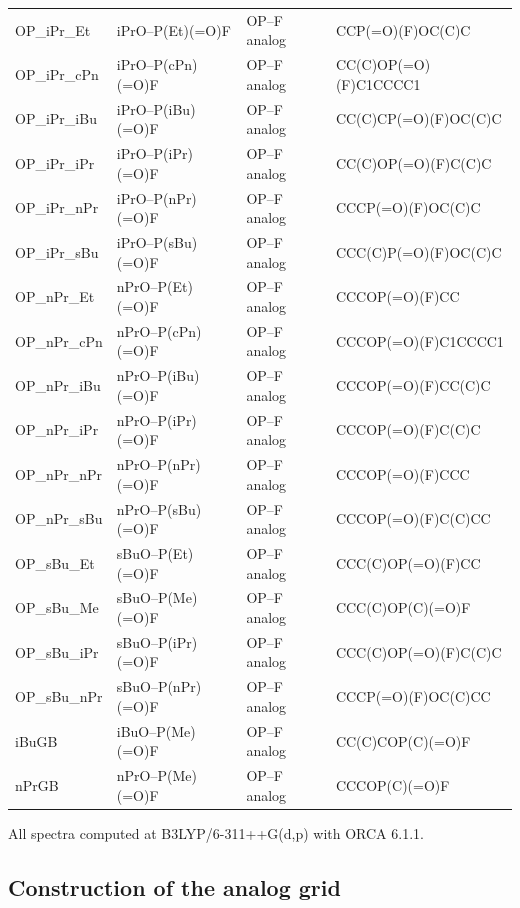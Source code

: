 \documentclass[11pt]{article}
\begin{document}
{\begin{longtable}{p{2.9cm} >{\raggedright\arraybackslash}p{2.8cm} >{\raggedright\arraybackslash}p{3.7cm} >{\ttfamily\raggedright\arraybackslash}p{4.4cm}}
OP\_iPr\_Et & iPrO--P(Et)(=O)F & OP--F analog & {CCP(=O)(F)OC(C)C} \\
OP\_iPr\_cPn & iPrO--P(cPn)(=O)F & OP--F analog & {CC(C)OP(=O)(F)C1CCCC1} \\
OP\_iPr\_iBu & iPrO--P(iBu)(=O)F & OP--F analog & {CC(C)CP(=O)(F)OC(C)C} \\
OP\_iPr\_iPr & iPrO--P(iPr)(=O)F & OP--F analog & {CC(C)OP(=O)(F)C(C)C} \\
OP\_iPr\_nPr & iPrO--P(nPr)(=O)F & OP--F analog & {CCCP(=O)(F)OC(C)C} \\
OP\_iPr\_sBu & iPrO--P(sBu)(=O)F & OP--F analog & {CCC(C)P(=O)(F)OC(C)C} \\
OP\_nPr\_Et & nPrO--P(Et)(=O)F & OP--F analog & {CCCOP(=O)(F)CC} \\
OP\_nPr\_cPn & nPrO--P(cPn)(=O)F & OP--F analog & {CCCOP(=O)(F)C1CCCC1} \\
OP\_nPr\_iBu & nPrO--P(iBu)(=O)F & OP--F analog & {CCCOP(=O)(F)CC(C)C} \\
OP\_nPr\_iPr & nPrO--P(iPr)(=O)F & OP--F analog & {CCCOP(=O)(F)C(C)C} \\
OP\_nPr\_nPr & nPrO--P(nPr)(=O)F & OP--F analog & {CCCOP(=O)(F)CCC} \\
OP\_nPr\_sBu & nPrO--P(sBu)(=O)F & OP--F analog & {CCCOP(=O)(F)C(C)CC} \\
OP\_sBu\_Et & sBuO--P(Et)(=O)F & OP--F analog & {CCC(C)OP(=O)(F)CC} \\
OP\_sBu\_Me & sBuO--P(Me)(=O)F & OP--F analog & {CCC(C)OP(C)(=O)F} \\
OP\_sBu\_iPr & sBuO--P(iPr)(=O)F & OP--F analog & {CCC(C)OP(=O)(F)C(C)C} \\
OP\_sBu\_nPr & sBuO--P(nPr)(=O)F & OP--F analog & {CCCP(=O)(F)OC(C)CC} \\
iBuGB & iBuO--P(Me)(=O)F & OP--F analog & {CC(C)COP(C)(=O)F} \\
nPrGB & nPrO--P(Me)(=O)F & OP--F analog & {CCCOP(C)(=O)F} \\
\end{longtable}}

\begin{flushleft}\footnotesize All spectra computed at B3LYP/6-311++G(d,p) with ORCA 6.1.1.\end{flushleft}
\clearpage

\subsection{Construction of the analog grid}
\end{document}
